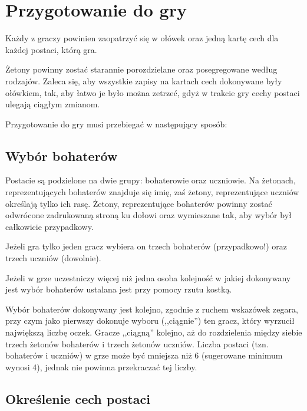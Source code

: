 \section{Przygotowanie do gry}

Każdy z graczy powinien zaopatrzyć się w ołówek oraz jedną kartę cech dla każdej postaci, którą gra.

Żetony powinny zostać starannie porozdzielane oraz posegregowane według rodzajów.
Zaleca się, aby wszystkie zapisy na kartach cech dokonywane były ołówkiem, tak, aby łatwo je było można zetrzeć, gdyż w trakcie gry cechy postaci ulegają ciągłym zmianom.

Przygotowanie do gry musi przebiegać w następujący sposób:

\subsection{Wybór bohaterów}

Postacie są podzielone na dwie grupy: bohaterowie oraz uczniowie.
Na żetonach, reprezentujących bohaterów znajduje się imię, zaś żetony, reprezentujące uczniów określają tylko ich rasę.
Żetony, reprezentujące bohaterów powinny zostać odwrócone zadrukowaną stroną ku dołowi oraz wymieszane tak, aby wybór był całkowicie przypadkowy.

Jeżeli gra tylko jeden gracz wybiera on trzech bohaterów (przypadkowo!) oraz trzech uczniów (dowolnie).

Jeżeli w grze uczestniczy więcej niż jedna osoba kolejność w jakiej dokonywany jest wybór bohaterów ustalana jest przy pomocy rzutu kostką.

Wybór bohaterów dokonywany jest kolejno, zgodnie z ruchem wskazówek zegara, przy czym jako pierwszy dokonuje wyboru (,,ciągnie'') ten gracz, który wyrzucił największą liczbę oczek. Gracze ,,ciągną'' kolejno, aż do rozdzielenia między siebie trzech żetonów bohaterów i trzech żetonów uczniów.
Liczba postaci (tzn. bohaterów i uczniów) w grze może być mniejsza niż 6 (sugerowane minimum wynosi 4), jednak nie powinna przekraczać tej liczby.

\subsection{Określenie cech postaci}


